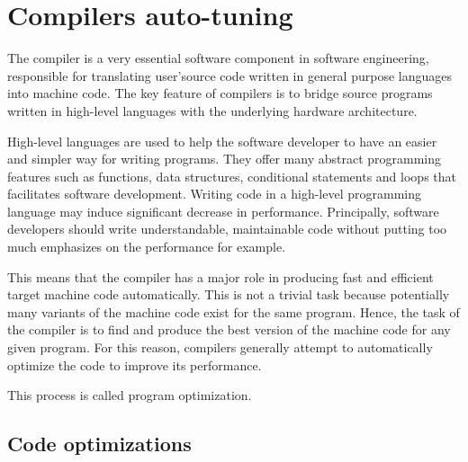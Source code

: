 \begin{itemize}
	
\end{itemize}






\section{Compilers auto-tuning}
The compiler is a very essential software component in software engineering, responsible for translating user'source code written in general purpose languages into machine code. The key feature of compilers is to bridge source programs written in high-level languages with the underlying hardware architecture.

High-level languages are used to help the software developer to have an easier and simpler way for writing programs. They offer many abstract programming features such as functions, data structures, conditional statements and loops that facilitates software development.
Writing code in a high-level programming language may induce significant decrease in performance. Principally, software developers should write understandable, maintainable code without putting too much emphasizes on the performance for example. 

This means that the compiler has a major role in producing fast and efficient target machine code automatically. This is not a trivial task because potentially many variants of the machine code exist for the same program. Hence, the task of the compiler is to find and produce the best version of the machine code for any given program. For this reason, compilers generally attempt to automatically optimize the code to improve its performance.

This process is called program optimization. 
\subsection{Code optimizations}

